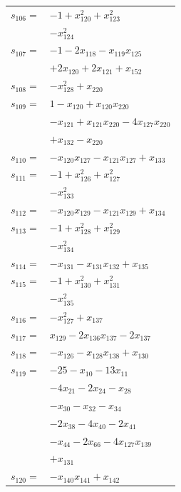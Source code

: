 \begin{longtable}{@{}r@{\;}l@{}}
\(s_{106}=\) & \(\displaystyle -1 +x_{120}^{2} +x_{123}^{2}\) \\
 & \(\displaystyle -x_{124}^{2}\) \\[3pt]
\(s_{107}=\) & \(\displaystyle -1 -2x_{118} -x_{119}x_{125}\) \\
 & \(\displaystyle +2x_{120} +2x_{121} +x_{152}\) \\[3pt]
\(s_{108}=\) & \(\displaystyle -x_{128}^{2} +x_{220}\) \\[3pt]
\(s_{109}=\) & \(\displaystyle 1 -x_{120} +x_{120}x_{220}\) \\
 & \(\displaystyle -x_{121} +x_{121}x_{220} -4x_{127}x_{220}\) \\
 & \(\displaystyle +x_{132} -x_{220}\) \\[3pt]
\(s_{110}=\) & \(\displaystyle -x_{120}x_{127} -x_{121}x_{127} +x_{133}\) \\[3pt]
\(s_{111}=\) & \(\displaystyle -1 +x_{126}^{2} +x_{127}^{2}\) \\
 & \(\displaystyle -x_{133}^{2}\) \\[3pt]
\(s_{112}=\) & \(\displaystyle -x_{120}x_{129} -x_{121}x_{129} +x_{134}\) \\[3pt]
\(s_{113}=\) & \(\displaystyle -1 +x_{128}^{2} +x_{129}^{2}\) \\
 & \(\displaystyle -x_{134}^{2}\) \\[3pt]
\(s_{114}=\) & \(\displaystyle -x_{131} -x_{131}x_{132} +x_{135}\) \\[3pt]
\(s_{115}=\) & \(\displaystyle -1 +x_{130}^{2} +x_{131}^{2}\) \\
 & \(\displaystyle -x_{135}^{2}\) \\[3pt]
\(s_{116}=\) & \(\displaystyle -x_{127}^{2} +x_{137}\) \\[3pt]
\(s_{117}=\) & \(\displaystyle x_{129} -2x_{136}x_{137} -2x_{137}\) \\[3pt]
\(s_{118}=\) & \(\displaystyle -x_{126} -x_{128}x_{138} +x_{130}\) \\[3pt]
\(s_{119}=\) & \(\displaystyle -25 -x_{10} -13x_{11}\) \\
 & \(\displaystyle -4x_{21} -2x_{24} -x_{28}\) \\
 & \(\displaystyle -x_{30} -x_{32} -x_{34}\) \\
 & \(\displaystyle -2x_{38} -4x_{40} -2x_{41}\) \\
 & \(\displaystyle -x_{44} -2x_{66} -4x_{127}x_{139}\) \\
 & \(\displaystyle +x_{131}\) \\[3pt]
\(s_{120}=\) & \(\displaystyle -x_{140}x_{141} +x_{142}\) \\[3pt]

\end{longtable}
